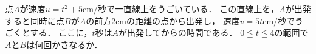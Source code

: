 \documentclass[../../main.tex]{subfiles}
\begin{document}
点$A$が速度$u=t^2+5\text{cm}/\text{秒}$で一直線上をうごいている．
この直線上を，$A$が出発すると同時に点$B$が$A$の前方2cmの距離の点から出発し，
速度$v=5t\text{cm}/\text{秒}$でうごくとする．
ここに，$t$秒は$A$が出発してからの時間である．
$0 \leqq t \leqq 4$の範囲で$A$と$B$は何回かさなるか．
\end{document}
